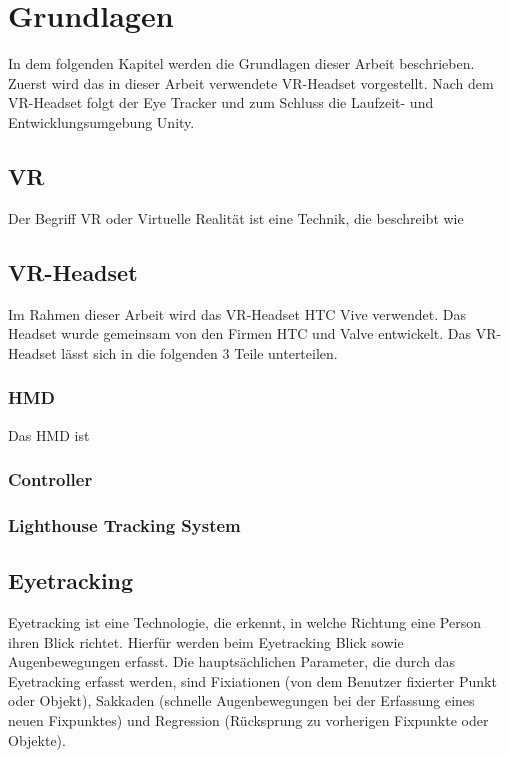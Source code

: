 
\chapter{Grundlagen}
In dem folgenden Kapitel werden die Grundlagen dieser Arbeit beschrieben. Zuerst wird das in dieser Arbeit verwendete \acs{VR}-Headset vorgestellt. Nach dem \acs{VR}-Headset folgt der Eye Tracker und zum Schluss die Laufzeit- und Entwicklungsumgebung Unity.

\section{\acl{VR}}
Der Begriff \ac{VR} oder Virtuelle Realität ist eine Technik, die beschreibt wie 

\section{\acs{VR}-Headset}
Im Rahmen dieser Arbeit wird das \acs{VR}-Headset HTC Vive verwendet. Das Headset wurde gemeinsam von den Firmen HTC und Valve entwickelt. Das \acs{VR}-Headset lässt sich in die folgenden 3 Teile unterteilen. 

\cite{Clay_Koenig_Koenig_2019}
\subsection{\acl{HMD}}
Das \ac{HMD} ist 

\subsection{Controller}

\subsection{Lighthouse Tracking System}

\section{Eyetracking}
Eyetracking ist eine Technologie, die erkennt, in welche Richtung eine Person ihren Blick richtet. Hierfür werden beim Eyetracking Blick sowie Augenbewegungen erfasst. Die hauptsächlichen Parameter, die durch das Eyetracking erfasst werden, sind Fixiationen (von dem Benutzer fixierter Punkt oder Objekt), Sakkaden (schnelle Augenbewegungen bei der Erfassung eines neuen Fixpunktes) und Regression (Rücksprung zu vorherigen Fixpunkte oder Objekte).

